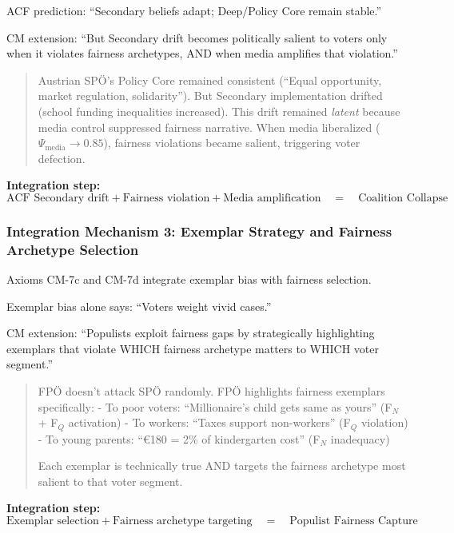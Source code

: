 ACF prediction: ``Secondary beliefs adapt; Deep/Policy Core remain stable.''

CM extension: ``But Secondary drift becomes politically salient to voters only when it violates
fairness archetypes, AND when media amplifies that violation.''

\begin{quote}
Austrian SPÖ's Policy Core remained consistent (``Equal opportunity, market regulation, solidarity'').
But Secondary implementation drifted (school funding inequalities increased). This drift remained
\textit{latent} because media control suppressed fairness narrative. When media liberalized ($\Psi_{\text{media}} \rightarrow 0.85$),
fairness violations became salient, triggering voter defection.
\end{quote}

\textbf{Integration step:}
\begin{equation}
\text{ACF Secondary drift} + \text{Fairness violation} + \text{Media amplification} \quad = \quad \text{Coalition Collapse}
\end{equation}

\subsubsection{Integration Mechanism 3: Exemplar Strategy and Fairness Archetype Selection}

Axioms CM-7c and CM-7d integrate exemplar bias with fairness selection.

Exemplar bias alone says: ``Voters weight vivid cases.''

CM extension: ``Populists exploit fairness gaps by strategically highlighting exemplars that
violate WHICH fairness archetype matters to WHICH voter segment.''

\begin{quote}
FPÖ doesn't attack SPÖ randomly. FPÖ highlights fairness exemplars specifically:
- To poor voters: ``Millionaire's child gets same as yours'' (F$_N$ + F$_Q$ activation)
- To workers: ``Taxes support non-workers'' (F$_Q$ violation)
- To young parents: ``€180 = 2\% of kindergarten cost'' (F$_N$ inadequacy)

Each exemplar is technically true AND targets the fairness archetype most salient to that voter segment.
\end{quote}

\textbf{Integration step:}
\begin{equation}
\text{Exemplar selection} + \text{Fairness archetype targeting} \quad = \quad \text{Populist Fairness Capture}
\end{equation}

